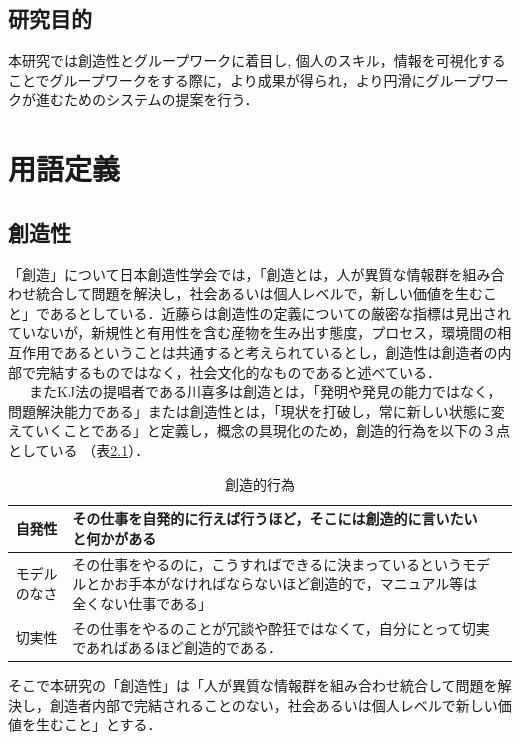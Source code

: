 \documentclass{funthesis}
\begin{document}
\section{研究目的}
本研究では創造性とグループワークに着目し,  個人のスキル，情報を可視化することでグループワークをする際に，より成果が得られ，より円滑にグループワークが進むためのシステムの提案を行う．
\chapter{用語定義}
\section{創造性}
「創造」について日本創造性学会では，「創造とは，人が異質な情報群を組み合わせ統合して問題を解決し，社会あるいは個人レベルで，新しい価値を生むこと」であるとしている\cite{A12}．近藤ら\cite{A13}は創造性の定義についての厳密な指標は見出されていないが，新規性と有用性を含む産物を生み出す態度，プロセス，環境間の相互作用であるということは共通すると考えられているとし，創造性は創造者の内部で完結するものではなく，社会文化的なものであると述べている．\\
\ \ \ またKJ法の提唱者である川喜多は創造とは，「発明や発見の能力ではなく，問題解決能力である」または創造性とは，「現状を打破し，常に新しい状態に変えていくことである」と定義し，概念の具現化のため，創造的行為を以下の３点としている\cite{A14} \cite{A15}（表\ref{souzousei}）．

\begin{table}[H]
\begin{center}
 \caption{創造的行為}
  \begin{tabular}{|c|p{105mm}|p{10mm}|} \hline
    自発性& その仕事を自発的に行えば行うほど，そこには創造的に言いたいと何かがある\tabularnewline \hline
    モデルのなさ& その仕事をやるのに，こうすればできるに決まっているというモデルとかお手本がなければならないほど創造的で，マニュアル等は全くない仕事である」 \tabularnewline \hline
    切実性&その仕事をやるのことが冗談や酔狂ではなくて，自分にとって切実であればあるほど創造的である．\tabularnewline
    \hline
  \end{tabular}

  \label{souzousei}
  \end{center}
\end{table}

そこで本研究の「創造性」は「人が異質な情報群を組み合わせ統合して問題を解決し，創造者内部で完結されることのない，社会あるいは個人レベルで新しい価値を生むこと」とする．
\end{document}
